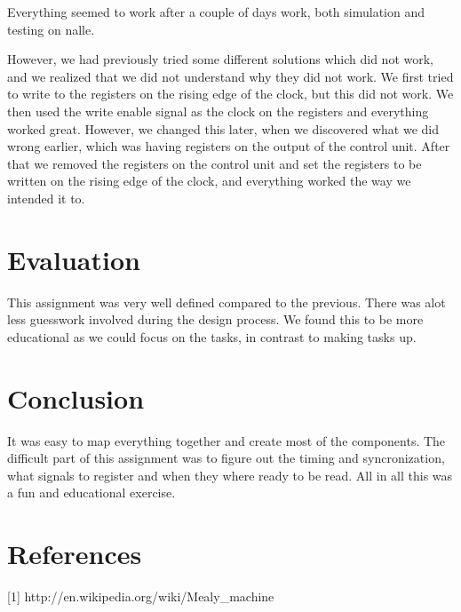 \documentclass[11pt]{report}
\begin{document}

Everything seemed to work after a couple of days work, 
both simulation and testing on nalle.

However, we had previously tried some different solutions
which did not work, and we realized that we did not understand why they did 
not work. We first tried to write to the registers on the rising edge of the clock, 
but this did not work. We then used the write enable signal as the clock 
on the registers and everything worked great.
However, we changed this later, when we discovered what we did wrong earlier,
which was having registers on the output of the control unit. After that
we removed the registers on the control unit and set the registers to be
written on the rising edge of the clock, and everything worked the way we
intended it to.

\section*{Evaluation}


This assignment was very well defined compared to the previous. There was
alot less guesswork involved during the design process. We found this to
be more educational as we could focus on the tasks, in contrast to
making tasks up.

\section*{Conclusion}


It was easy to map everything together and create most of the components. 
The difficult part of this assignment was to figure out the timing 
and syncronization, what signals to register and when they where 
ready to be read. All in all this was a fun and educational exercise.

\section*{References}

[1] http://en.wikipedia.org/wiki/Mealy\_machine
\end{document}
